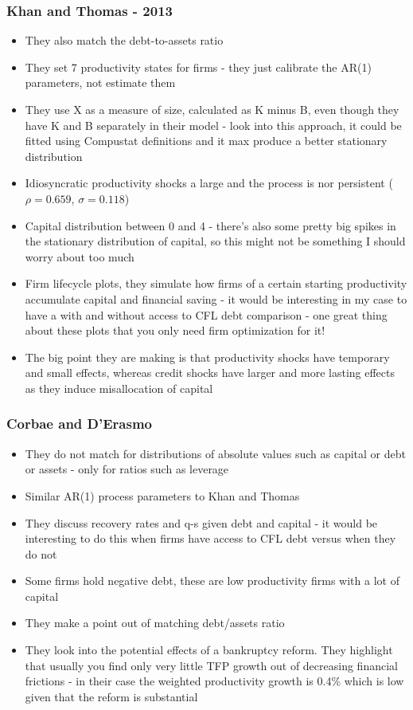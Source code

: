 \documentclass[12pt]{article}
\begin{document}
\subsubsection*{Khan and Thomas - 2013}
\begin{itemize}\setlength\itemsep{0em} \small
    \item They also match the debt-to-assets ratio
    \item They set 7 productivity states for firms - they just calibrate the AR(1) parameters, not estimate them
    \item They use X as a measure of size, calculated as K minus B, even though they have K and B separately in their model - look into this approach, it could be fitted using Compustat definitions and it max produce a better stationary distribution
    \item Idiosyncratic productivity shocks a large and the process is nor persistent ($\rho = 0.659$, $\sigma = 0.118$)
    \item Capital distribution between 0 and 4 - there's also some pretty big spikes in the stationary distribution of capital, so this might not be something I should worry about too much
    \item Firm lifecycle plots, they simulate how firms of a certain starting productivity accumulate capital and financial saving - it would be interesting in my case to have a with and without access to CFL debt comparison - one great thing about these plots that you only need firm optimization for it!
    \item The big point they are making is that productivity shocks have temporary and small effects, whereas credit shocks have larger and more lasting effects as they induce misallocation of capital
\end{itemize} \normalsize

\subsubsection*{Corbae and D'Erasmo}
\begin{itemize}\setlength\itemsep{0em} \small
    \item They do not match for distributions of absolute values such as capital or debt or assets - only for ratios such as leverage
    \item Similar AR(1) process parameters to Khan and Thomas
    \item They discuss recovery rates and q-s given debt and capital - it would be interesting to do this when firms have access to CFL debt versus when they do not
    \item Some firms hold negative debt, these are low productivity firms with a lot of capital
    \item They make a point out of matching debt/assets ratio
    \item They look into the potential effects of a bankruptcy reform. They highlight that usually you find only very little TFP growth out of decreasing financial frictions - in their case the weighted productivity growth is 0.4\% which is low given that the reform is substantial
\end{itemize} \normalsize
\end{document}
